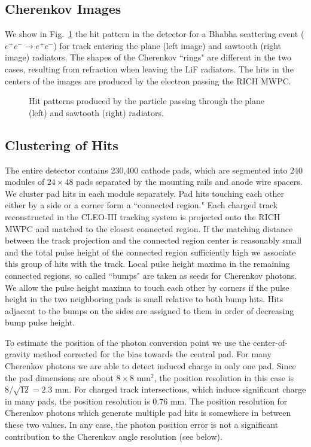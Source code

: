 \documentclass[fleqn,twoside]{article}
\begin{document}
\subsection{Cherenkov Images}

We show in Fig.~\ref{images} the hit pattern in the detector for a Bhabha
scattering event ($e^+e^-\to e^+e^-$) for track entering the
plane (left image) and
sawtooth (right image) radiators.
The shapes of the Cherenkov ``rings" are different in the two cases,
resulting from refraction when leaving the LiF radiators.
The hits in the centers of the images are produced by
the electron passing the RICH MWPC.


\begin{figure} [htb]
\vspace{-.8cm} \centerline{\epsfysize
1.38in
            \epsfysize 1.43in}
\vspace{-.7cm}
\caption{\label{images}
      Hit patterns produced by the particle passing through the plane
      (left) and sawtooth (right) radiators.}
\vspace{-0.7cm}\end{figure}


\subsection{Clustering of Hits}

The entire detector contains 230,400 cathode pads, which are
segmented into 240 modules of $24\times48$ pads separated by the
mounting rails and anode wire spacers. We cluster pad hits in each
module separately. Pad hits touching each other either by a side
or a corner form a ``connected region." Each charged track
reconstructed in the CLEO-III tracking system \cite{Peterson} is
projected onto the RICH MWPC and matched to the closest connected
region. If the matching distance between the track projection and
the connected region center is reasonably small and the total
pulse height of the connected region sufficiently high we
associate this group of hits with the track. Local pulse height
maxima in the remaining connected regions, so called ``bumps"  are
taken as seeds for Cherenkov photons. We allow the pulse height
maxima to touch each other by corners if the pulse height in the
two neighboring pads is small relative to both bump hits. Hits
adjacent to the bumps on the sides are assigned to them in order
of decreasing bump pulse height.

To estimate the position of the photon conversion point we use the
center-of-gravity method corrected for the bias towards the
central pad. For many Cherenkov photons we are able to detect
induced charge in only one pad. Since the pad dimensions are about
$8\times8$ mm$^2$, the position resolution in this case is
$8/\sqrt{12}=2.3$ mm. For charged track intersections, which
induce significant charge in many pads, the position resolution is
$0.76$ mm. The position resolution for Cherenkov photons which
generate multiple pad hits is somewhere in between these two
values. In any case, the photon position error is not a
significant contribution to the Cherenkov angle resolution (see
below).
\end{document}
